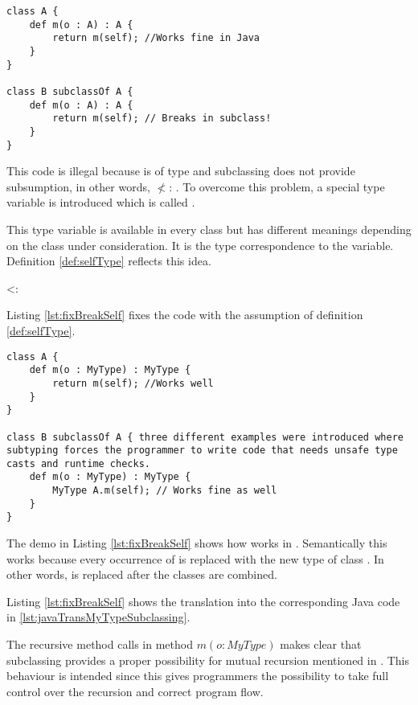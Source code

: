 \begin{lstlisting}[float,language=ooplss,caption=Illegal method m(o : \A) : \emph{Void} in class \B,label=lst:breakSelf]
class A {
	def m(o : A) : A {
		return m(self); //Works fine in Java
	}
}

class B subclassOf A {
	def m(o : A) : A {
		return m(self); // Breaks in subclass!
	}
}
\end{lstlisting}

This code is illegal because \self is of type \B and subclassing does
not provide subsumption, in other words, \B $\nless$: \A. To overcome this problem,
a special type variable is introduced which is called \mytype.

This type variable is available in every class but has different meanings
depending on the class under consideration. It is the type correspondence
to the \self variable. Definition \ref{def:selfType} reflects this idea.

\begin{defn}
	\label{def:selfType}
	\self <: \mytype
\end{defn}

Listing \ref{lst:fixBreakSelf} fixes the code with the assumption of
definition \ref{def:selfType}.

\begin{lstlisting}[float,language=ooplss,caption=Type safe code with \mytype,label=lst:fixBreakSelf]
class A {
	def m(o : MyType) : MyType {
		return m(self); //Works well
	}
}

class B subclassOf A { three different examples were introduced where subtyping forces the programmer to write code that needs unsafe type casts and runtime checks.
	def m(o : MyType) : MyType {
		MyType A.m(self); // Works fine as well
	}
}
\end{lstlisting}

The demo in Listing \ref{lst:fixBreakSelf} shows how \mytype works 
in \ooplss.  Semantically this works because every occurrence of \mytype
is replaced with the new type of class \B. In other words, \mytype is
replaced after the classes are combined.

Listing \ref{lst:fixBreakSelf} shows the translation into the corresponding
Java code in \ref{lst:javaTransMyTypeSubclassing}. 

The recursive
method calls in method $m(o : MyType)$ makes clear that subclassing
provides a proper possibility for mutual recursion mentioned in
. This behaviour is intended since this gives
programmers the possibility to take full control over the recursion
and correct program flow.

